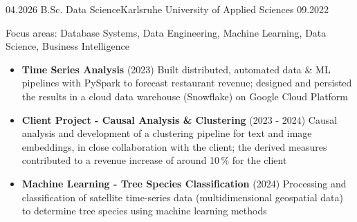 
\begin{experiences}
  \experience
    {04.2026}   {B.Sc. Data Science}{Karlsruhe University of Applied Sciences}{}
    {09.2022}   {Focus areas: Database Systems, Data Engineering, Machine Learning, Data Science, Business Intelligence
                  \begin{itemize}
                    \item \textbf{Time Series Analysis} (2023)
                    Built distributed, automated data \& ML pipelines with PySpark to forecast restaurant revenue; designed and persisted the results in a cloud data warehouse (Snowflake) on Google Cloud Platform

                    \item \textbf{Client Project - Causal Analysis \& Clustering} (2023 - 2024)
                    Causal analysis and development of a clustering pipeline for text and image embeddings, in close collaboration with the client; the derived measures contributed to a revenue increase of around 10\,\% for the client
                    {}

                    \item \textbf{Machine Learning - Tree Species Classification} (2024)
                    Processing and classification of satellite time-series data (multidimensional geospatial data) to determine tree species using machine learning methods
                    {}
                  \end{itemize}
                }
                {}
  \emptySeparator
\end{experiences}